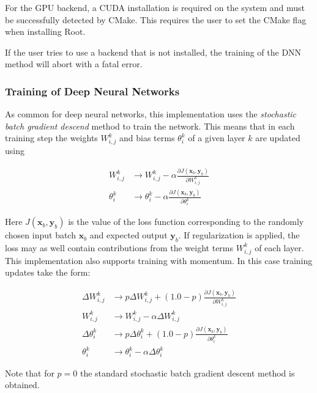For the GPU backend, a CUDA installation is required on the system and
must be successfully detected by CMake. This requires the user to set the
  CMake flag when installing Root.

If the user tries to use a backend that is not installed, the training
of the DNN method will abort with a fatal error.

\subsubsection{Training of Deep Neural Networks}
\label{sec:dnn:update}

As common for deep neural networks, this implementation uses the
\textit{stochastic batch gradient descend} method to train the network.
This means that in each training step the weights $W^k_{i,j}$ and bias
terms $\theta_{i}^k$ of a given layer $k$ are updated using

\begin{align}
  W^k_{i,j}   & \rightarrow W^k_{i,j}   - \alpha \frac{\partial J(\mathbf{x}_b, \mathbf{y}_b)}{\partial W^k_{i,j}} \\
  \theta^k_i & \rightarrow \theta^k_i - \alpha \frac{\partial J(\mathbf{x}_b, \mathbf{y}_b)}{\partial \theta^k_{i}}
\end{align}

Here $J(\mathbf{x}_b,\mathbf{y}_b)$ is the value of the loss function corresponding to
the randomly chosen input batch $\mathbf{x}_b$ and expected output
$\mathbf{y}_b$. If regularization is applied, the loss may as well contain
contributions from the weight terms $W^k_{i,j}$ of each layer. This implementation also supports training with momentum. In this case training updates take the form:

\begin{align}
  \Delta W^k_{i,j}   & \rightarrow p \Delta W^k_{i,j}   + (1.0 - p) \frac{\partial J(\mathbf{x}_b, \mathbf{y}_b)}{\partial W^k_{i,j}} \\
  W^k_{i,j}   & \rightarrow W^k_{i,j}   - \alpha \Delta W^k_{i,j} \\
  \Delta \theta^k_i & \rightarrow p \Delta \theta^k_i + (1.0 - p) \frac{\partial J(\mathbf{x}_b, \mathbf{y}_b)}{\partial \theta^k_{i}} \\
  \theta^k_i & \rightarrow \theta^k_i - \alpha \Delta \theta^k_i
\end{align}

Note that for $p = 0$ the standard stochastic batch gradient descent method is
obtained.

